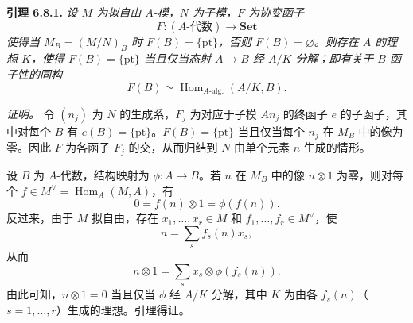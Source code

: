 \medskip
\noindent{}\textbf{引理 6.8.1.}
\textit{设 \(M\) 为拟自由 \(A\)-模，\(N\) 为子模，\(F\) 为协变函子}
\[
  F:(\text{\(A\)-代数})\longrightarrow\mathbf{Set}
\]
\textit{使得当 \(M_B=(M/N)_B\) 时 \(F(B)=\{\mathrm{pt}\}\)，否则 \(F(B)=\varnothing\)。则存在 \(A\) 的理想 \(K\)，使得 \(F(B)=\{\mathrm{pt}\}\) 当且仅当态射 \(A\to B\) 经 \(A/K\) 分解；即有关于 \(B\) 函子性的同构}
\[
  F(B)\simeq\operatorname{Hom}_{A\text{-alg.}}(A/K,B).
\]

\smallskip
\noindent\textit{证明。}
令 \((n_j)\) 为 \(N\) 的生成系，\(F_j\) 为对应于子模 \(An_j\) 的终函子 \(e\) 的子函子，其中对每个 \(B\) 有 \(e(B)=\{\mathrm{pt}\}\)。\(F(B)=\{\mathrm{pt}\}\) 当且仅当每个 \(n_j\) 在 \(M_B\) 中的像为零。因此 \(F\) 为各函子 \(F_j\) 的交，从而归结到 \(N\) 由单个元素 \(n\) 生成的情形。

设 \(B\) 为 \(A\)-代数，结构映射为 \(\phi:A\to B\)。若 \(n\) 在 \(M_B\) 中的像 \(n\otimes1\) 为零，则对每个 \(f\in M^\vee=\operatorname{Hom}_A(M,A)\)，有
\[
  0=f(n)\otimes1=\phi(f(n)).
\]
反过来，由于 \(M\) 拟自由，存在 \(x_1,\ldots,x_r\in M\) 和 \(f_1,\ldots,f_r\in M^\vee\)，使
\[
  n=\sum_sf_s(n)x_s,
\]
从而
\[
  n\otimes1=\sum_sx_s\otimes\phi(f_s(n)).
\]
由此可知，\(n\otimes1=0\) 当且仅当 \(\phi\) 经 \(A/K\) 分解，其中 \(K\) 为由各 \(f_s(n)\)（\(s=1,\ldots,r\)）生成的理想。引理得证。
